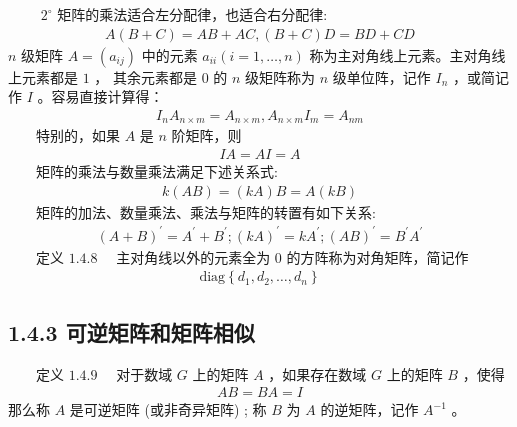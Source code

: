 \documentclass[a4paper,11pt,english]{sphinxmanual}
\begin{document}
\sphinxAtStartPar
   \(2^{\circ}\)  矩阵的乘法适合左分配律，也适合右分配律:
\begin{equation*}
\begin{split}A(B+C)=A B+A C,(B+C) D=B D+C D\end{split}
\end{equation*}
\sphinxAtStartPar
\(n\) 级矩阵 \(A=\left(a_{i j}\right)\) 中的元素 \(a_{i i}(i=1,\ldots, n)\) 称为主对角线上元素。主对角线上元素都是  \(1\) ， 其余元素都是 0 的  \(n\) 级矩阵称为 \(n\)  级单位阵，记作  \(I_{n}\)  ，或简记作  \(I\)  。容易直接计算得：
\begin{equation*}
\begin{split}I_{ n} A_{n \times m }=A_{n \times m}, A_{n \times m} I_{m}=A_{n m}\end{split}
\end{equation*}
\sphinxAtStartPar
​  特别的，如果  \(A\)  是  \(n\)  阶矩阵，则
\begin{equation*}
\begin{split}I A=A I=A\end{split}
\end{equation*}
\sphinxAtStartPar
​  矩阵的乘法与数量乘法满足下述关系式:
\begin{equation*}
\begin{split}k(A B)=(k A) B=A(k B)\end{split}
\end{equation*}
\sphinxAtStartPar
​  矩阵的加法、数量乘法、乘法与矩阵的转置有如下关系:
\begin{equation*}
\begin{split}(A+B)^{\prime}=A^{\prime}+B^{\prime} ;(k A)^{\prime}=k A^{\prime} ;(A B)^{\prime}=B^{\prime} A^{\prime}\end{split}
\end{equation*}
\sphinxAtStartPar
​  定义 \(1.4.8\)   主对角线以外的元素全为 0 的方阵称为对角矩阵，简记作
\begin{equation*}
\begin{split}\text{diag}\left\{d_{1}, d_{2}, \ldots, d_{n}\right\}\end{split}
\end{equation*}

\subsection{1.4.3 可逆矩阵和矩阵相似}
\label{\detokenize{rst/_u9644_u5f551_u91cf_u5b50_u8ba1_u7b97_u6570_u5b66_u57fa_u78403:id4}}
\sphinxAtStartPar
​  定义 \(1.4.9\)   对于数域  \(G\)  上的矩阵  \(A\)  ，如果存在数域  \(G\)  上的矩阵  \(B\)  ，使得
\begin{equation*}
\begin{split}A B=B A=I\end{split}
\end{equation*}
\sphinxAtStartPar
那么称  \(A\)  是可逆矩阵 (或非奇异矩阵) ; 称  \(B\)  为  \(A\)  的逆矩阵，记作  \(A^{-1}\)  。
\end{document}
